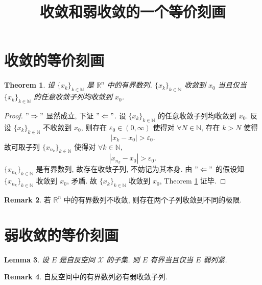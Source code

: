 \documentclass[a4paper,11pt]{article}
\title{收敛和弱收敛的一个等价刻画}
\newtheorem{theorem}{Theorem}[section]
\newtheorem{lemma}[theorem]{Lemma}
\theoremstyle{definition}
\newtheorem{remark}[theorem]{Remark}
\begin{document}
\begin{CJK*}{UTF8}{gbsn}

\maketitle

\section{收敛的等价刻画}

\begin{theorem} \label{thm1}
    设 $ \{x_k\}_{k \in \mathbb{N}} $ 是 $ \mathbb{R}^n $ 中的有界数列.
    $ \{x_k\}_{k \in \mathbb{N}} $ 收敛到 $ x_0 $ 当且仅当 
    $ \{x_k\}_{k \in \mathbb{N}} $ 的任意收敛子列均收敛到 $ x_0 $.
\end{theorem}

\begin{proof}
    $ "\Rightarrow" $ 显然成立, 下证 $ "\Leftarrow" $. 
    设 $ \{x_k\}_{k \in \mathbb{N}} $ 的任意收敛子列均收敛到 $ x_0 $.
    反设 $ \{x_k\}_{k \in \mathbb{N}} $ 不收敛到 $ x_0 $, 
    则存在 $ \varepsilon_0 \in (0, \infty) $ 使得对 $ \forall N \in \mathbb{N} $, 存在 $ k > N $ 使得
    $$
        |x_k - x_0| > \varepsilon_0.
    $$
    故可取子列 $ \{x_{n_k}\}_{k \in \mathbb{N}} $ 使得对 $ \forall k \in \mathbb{N} $,
    $$
        |x_{n_k} - x_0| > \varepsilon_0.
    $$
    $ \{x_{n_k}\}_{k \in \mathbb{N}} $ 是有界数列, 故存在收敛子列, 不妨记为其本身.
    由 $ "\Leftarrow" $ 的假设知 $ \{x_{n_k}\}_{k \in \mathbb{N}} $ 收敛到 $ x_0 $, 矛盾.
    故 $ \{x_k\}_{k \in \mathbb{N}} $ 收敛到 $ x_0 $, Theorem \ref{thm1} 证毕.
\end{proof}

\begin{remark} \label{2}
    若 $ \mathbb{R}^n $ 中的有界数列不收敛, 则存在两个子列收敛到不同的极限.
\end{remark}

\section{弱收敛的等价刻画}

\begin{lemma} 
    设 $ E $ 是自反空间 $ \mathcal{X} $ 的子集. 则 $ E $ 有界当且仅当 $ E $ 弱列紧.
\end{lemma}

\begin{remark} \label{lem}
    自反空间中的有界数列必有弱收敛子列. 
\end{remark}


\end{CJK*}
\end{document}
